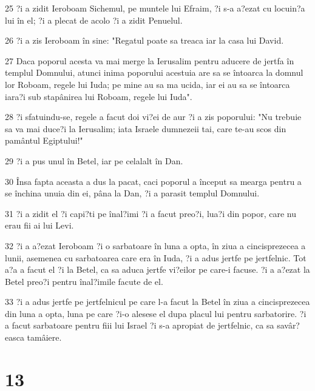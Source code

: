 \par 25 ?i a zidit Ieroboam Sichemul, pe muntele lui Efraim, ?i s-a a?ezat cu locuin?a lui în el; ?i a plecat de acolo ?i a zidit Penuelul.
\par 26 ?i a zis Ieroboam în sine: "Regatul poate sa treaca iar la casa lui David.
\par 27 Daca poporul acesta va mai merge la Ierusalim pentru aducere de jertfa în templul Domnului, atunci inima poporului acestuia are sa se întoarca la domnul lor Roboam, regele lui Iuda; pe mine au sa ma ucida, iar ei au sa se întoarca iara?i sub stapânirea lui Roboam, regele lui Iuda".
\par 28 ?i sfatuindu-se, regele a facut doi vi?ei de aur ?i a zis poporului: "Nu trebuie sa va mai duce?i la Ierusalim; iata Israele dumnezeii tai, care te-au scos din pamântul Egiptului!"
\par 29 ?i a pus unul în Betel, iar pe celalalt în Dan.
\par 30 Însa fapta aceasta a dus la pacat, caci poporul a început sa mearga pentru a se închina unuia din ei, pâna la Dan, ?i a parasit templul Domnului.
\par 31 ?i a zidit el ?i capi?ti pe înal?imi ?i a facut preo?i, lua?i din popor, care nu erau fii ai lui Levi.
\par 32 ?i a a?ezat Ieroboam ?i o sarbatoare în luna a opta, în ziua a cincisprezecea a lunii, asemenea cu sarbatoarea care era în Iuda, ?i a adus jertfe pe jertfelnic. Tot a?a a facut el ?i la Betel, ca sa aduca jertfe vi?eilor pe care-i facuse. ?i a a?ezat la Betel preo?i pentru înal?imile facute de el.
\par 33 ?i a adus jertfe pe jertfelnicul pe care l-a facut la Betel în ziua a cincisprezecea din luna a opta, luna pe care ?i-o alesese el dupa placul lui pentru sarbatorire. ?i a facut sarbatoare pentru fiii lui Israel ?i s-a apropiat de jertfelnic, ca sa savâr?easca tamâiere.

\chapter{13}

